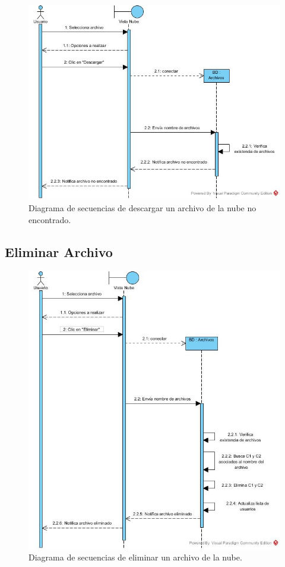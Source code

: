 \begin{figure}[htbp!]
\centering
\includegraphics[width=1\textwidth]{images/Descargar_aleternativa_a}
\caption{Diagrama de secuencias de descargar un archivo de la nube no encontrado.}
\end{figure} 
\newpage

\subsection{Eliminar Archivo}

\begin{figure}[htbp!]
\centering
\includegraphics[width=1\textwidth]{images/Eliminar_Archivo}
\caption{Diagrama de secuencias de eliminar un archivo de la nube.}
\end{figure} 
\newpage

